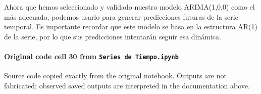 \documentclass[
  11pt,
]{article}
\begin{document}
Ahora que hemos seleccionado y validado nuestro modelo ARIMA(1,0,0) como el más adecuado, podemos usarlo para generar predicciones futuras de la serie temporal. Es importante recordar que este modelo se basa en la estructura AR(1) de la serie, por lo que sus predicciones intentarán seguir esa dinámica.

\paragraph{\texorpdfstring{Original code cell 30 from \texttt{Series\ de\ Tiempo.ipynb}}{Original code cell 30 from Series de Tiempo.ipynb}}\label{original-code-cell-30-from-series-de-tiempoipynb}

Source code copied exactly from the original notebook. Outputs are not fabricated; observed saved outputs are interpreted in the documentation above.
\end{document}
